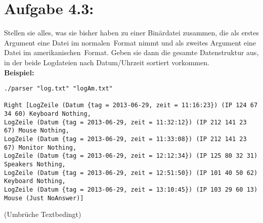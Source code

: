 \documentclass[a4paper,10pt]{scrartcl}
\newcommand{\theuebungszettel}{4}
\begin{document}
\section*{Aufgabe \theuebungszettel.3:}
Stellen sie alles, was sie bisher haben zu einer Binärdatei zusammen, die als erstes Argument eine Datei im \glqq normalen\grqq \ Format nimmt und als zweites Argument eine Datei im \glqq amerikanischen\grqq \ Format. Geben sie dann die gesamte Datenstruktur aus, in der beide Logdateien nach Datum/Uhrzeit sortiert vorkommen.\\
\textbf{Beispiel:}
\footnotesize
\begin{verbatim}
./parser "log.txt" "logAm.txt"

Right [LogZeile (Datum {tag = 2013-06-29, zeit = 11:16:23}) (IP 124 67 34 60) Keyboard Nothing,
LogZeile (Datum {tag = 2013-06-29, zeit = 11:32:12}) (IP 212 141 23 67) Mouse Nothing,
LogZeile (Datum {tag = 2013-06-29, zeit = 11:33:08}) (IP 212 141 23 67) Monitor Nothing,
LogZeile (Datum {tag = 2013-06-29, zeit = 12:12:34}) (IP 125 80 32 31) Speakers Nothing,
LogZeile (Datum {tag = 2013-06-29, zeit = 12:51:50}) (IP 101 40 50 62) Keyboard Nothing,
LogZeile (Datum {tag = 2013-06-29, zeit = 13:10:45}) (IP 103 29 60 13) Mouse (Just NoAnswer)]
\end{verbatim}
\normalsize
(Umbrüche Textbedingt)
\end{document}
